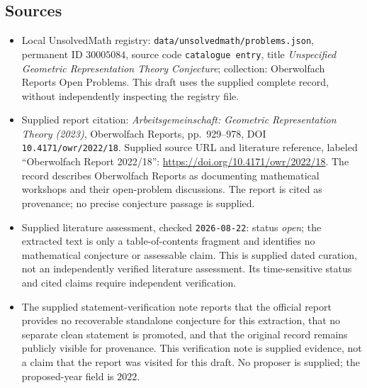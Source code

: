 \documentclass[11pt]{article}
\begin{document}
\subsection{Sources}
\begin{itemize}
\item Local UnsolvedMath registry: \texttt{data/unsolvedmath/problems.json}, permanent ID \(30005084\), source code \texttt{catalogue entry}, title \emph{Unspecified Geometric Representation Theory Conjecture}; collection: Oberwolfach Reports Open Problems. This draft uses the supplied complete record, without independently inspecting the registry file.
\item Supplied report citation: \emph{Arbeitsgemeinschaft: Geometric Representation Theory (2023)}, Oberwolfach Reports, pp.~929--978, DOI \texttt{10.4171/owr/2022/18}. Supplied source URL and literature reference, labeled ``Oberwolfach Report 2022/18'': \url{https://doi.org/10.4171/owr/2022/18}. The record describes Oberwolfach Reports as documenting mathematical workshops and their open-problem discussions. The report is cited as provenance; no precise conjecture passage is supplied.
\item Supplied literature assessment, checked \texttt{2026-08-22}: status \emph{open}; the extracted text is only a table-of-contents fragment and identifies no mathematical conjecture or assessable claim. This is supplied dated curation, not an independently verified literature assessment. Its time-sensitive status and cited claims require independent verification.
\item The supplied statement-verification note reports that the official report provides no recoverable standalone conjecture for this extraction, that no separate clean statement is promoted, and that the original record remains publicly visible for provenance. This verification note is supplied evidence, not a claim that the report was visited for this draft. No proposer is supplied; the proposed-year field is \(2022\).
\end{itemize}
\end{document}
